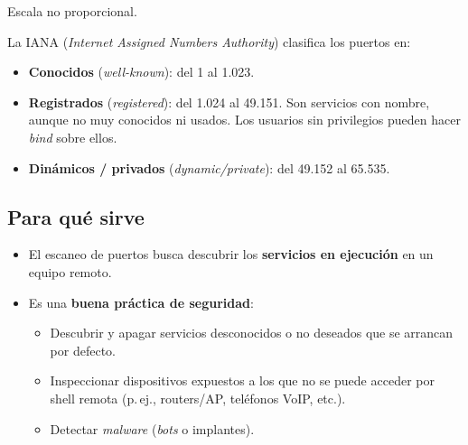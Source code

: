 \documentclass[11pt,a4paper]{report}
\begin{document}
\begin{center}
\end{center}
{\small Escala no proporcional.}
 
La IANA (\emph{Internet Assigned Numbers Authority}) clasifica los puertos en:
\begin{itemize}
  \item \textbf{Conocidos} (\emph{well-known}): del 1 al 1.023.
  \item \textbf{Registrados} (\emph{registered}): del 1.024 al 49.151. Son servicios con nombre, aunque no muy conocidos ni usados. Los usuarios sin privilegios pueden hacer \emph{bind} sobre ellos.
  \item \textbf{Dinámicos / privados} (\emph{dynamic/private}): del 49.152 al 65.535.
\end{itemize}
 
\subsection{Para qué sirve}
 
\begin{itemize}
  \item El escaneo de puertos busca descubrir los \textbf{servicios en ejecución} en un equipo remoto.
  \item Es una \textbf{buena práctica de seguridad}:
    \begin{itemize}
      \item Descubrir y apagar servicios desconocidos o no deseados que se arrancan por defecto.
      \item Inspeccionar dispositivos expuestos a los que no se puede acceder por shell remota (p.\,ej., routers/AP, teléfonos VoIP, etc.).
      \item Detectar \emph{malware} (\emph{bots} o implantes).
    \end{itemize}
\end{itemize}
 
\end{document}
